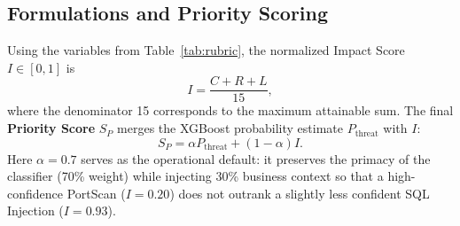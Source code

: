 \documentclass[conference]{IEEEtran}
\begin{document}
\begin{table}[htbp]
\centering
\caption{NIST SP 800-30-aligned Business Impact Rubric}
\label{tab:rubric}
\end{table}

\subsection{Formulations and Priority Scoring}
Using the variables from Table~\ref{tab:rubric}, the normalized Impact Score $I \in [0,1]$ is
\begin{equation}
I = \frac{C + R + L}{15},
\label{eq:impact}
\end{equation}
where the denominator 15 corresponds to the maximum attainable sum. The final \textbf{Priority Score} $S_P$ merges the XGBoost probability 
estimate $P_{\text{threat}}$ with $I$:
\begin{equation}
S_P = \alpha P_{\text{threat}} + (1 - \alpha) I.
\label{eq:priority}
\end{equation}
Here $\alpha = 0.7$ serves as the operational default: it preserves the primacy of the classifier (70\% weight) while injecting 30\% business context so that a high-confidence PortScan ($I = 0.20$) does not outrank a slightly less confident SQL Injection ($I = 0.93$).
\end{document}

